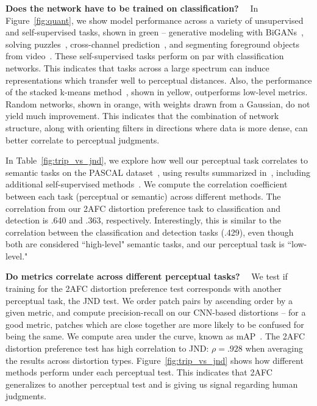   \textbf{Does the network have to be trained on classification?} \ \  In Figure~\ref{fig:quant}, we show model performance across a variety of unsupervised and self-supervised tasks, shown in green -- generative modeling with BiGANs~\cite{donahue2016adversarial}, solving puzzles~\cite{noroozi2016unsupervised}, cross-channel prediction~\cite{zhang2017split}, and segmenting foreground objects from video~\cite{pathak2017learning}. These self-supervised tasks perform on par with classification networks. This indicates that tasks across a large spectrum can induce representations which transfer well to perceptual distances. Also, the performance of the stacked k-means method~\cite{krahenbuhl2015data}, shown in yellow, outperforms low-level metrics. Random networks, shown in orange, with weights drawn from a Gaussian, do not yield much improvement. This indicates that the combination of network structure, along with orienting filters in directions where data is more dense, can better correlate to perceptual judgments.

In Table~\ref{fig:trip_vs_jnd}, we explore how well our perceptual task correlates to semantic tasks on the PASCAL dataset~\cite{pascal-voc-2007}, using results summarized in~\cite{zhang2017split}, including additional self-supervised methods~\cite{agrawal2015learning,pathakCVPR16context,doersch2015unsupervised,wang2015unsupervised,zhang2016colorful,owens2016visually}. We compute the correlation coefficient between each task (perceptual or semantic) across different methods. The correlation from our 2AFC distortion preference task to classification and detection is .640 and .363, respectively. Interestingly, this is similar to the correlation between the classification and detection tasks (.429), even though both are considered ``high-level" semantic tasks, and our perceptual task is ``low-level."

  \textbf{Do metrics correlate across different perceptual tasks?} \ \  We test if training for the 2AFC distortion preference test corresponds with another perceptual task, the JND test. We order patch pairs by ascending order by a given metric, and compute precision-recall on our CNN-based distortions -- for a good metric, patches which are close together are more likely to be confused for being the same. We compute area under the curve, known as mAP~\cite{pascal-voc-2007}. The 2AFC distortion preference test has high correlation to JND: $\rho=.928$ when averaging the results across distortion types. Figure~\ref{fig:trip_vs_jnd} shows how different methods perform under each perceptual test. This indicates that 2AFC generalizes to another perceptual test and is giving us signal regarding human judgments.


